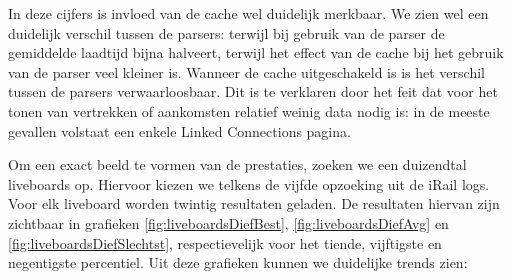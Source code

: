In deze cijfers is invloed van de cache wel duidelijk merkbaar. We zien wel een duidelijk verschil tussen de parsers: terwijl bij gebruik van de  parser de gemiddelde laadtijd bijna halveert, terwijl het effect van de cache bij het gebruik van de  parser veel kleiner is. Wanneer de cache uitgeschakeld is is het verschil tussen de parsers verwaarloosbaar. Dit is te verklaren door het feit dat voor het tonen van vertrekken of aankomsten relatief weinig data nodig is: in de meeste gevallen volstaat een enkele Linked Connections pagina.

Om een exact beeld te vormen van de prestaties, zoeken we een duizendtal liveboards op. Hiervoor kiezen we telkens de vijfde opzoeking uit de iRail logs. Voor elk liveboard worden twintig resultaten geladen. De resultaten hiervan zijn zichtbaar in grafieken \ref{fig:liveboardsDiefBest}, \ref{fig:liveboardsDiefAvg} en \ref{fig:liveboardsDiefSlechtst}, respectievelijk voor het tiende, vijftigste en negentigste percentiel. Uit deze grafieken kunnen we duidelijke trends zien:
